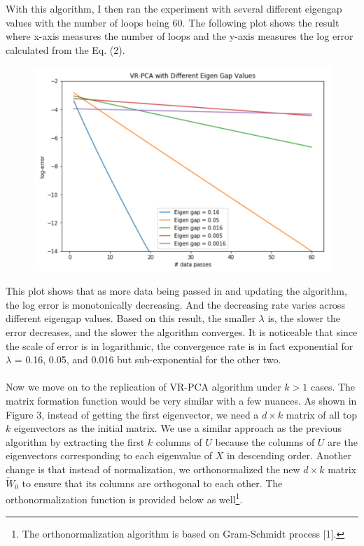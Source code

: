 \documentclass{article}
\begin{document}
With this algorithm, I then ran the experiment with several different eigengap values with the number of loops being 60. The following plot shows the result where x-axis measures the number of loops and the y-axis measures the log error calculated from the Eq. (2).
\begin{figure}[H]
    \centering
    \includegraphics[scale=0.5]{./plot1.png}
\end{figure}
This plot shows that as more data being passed in and updating the algorithm, the log error is monotonically decreasing. And the decreasing rate varies across different eigengap values. Based on this result, the smaller $\lambda$ is, the slower the error decreases, and the slower the algorithm converges. It is noticeable that since the scale of error is in logarithmic, the convergence rate is in fact exponential for $\lambda$ = 0.16, 0.05, and 0.016 but sub-exponential for the other two. \\ \\
Now we move on to the replication of VR-PCA algorithm under $k>1$ cases. The matrix formation function would be very similar with a few nuances. As shown in Figure 3, instead of getting the first eigenvector, we need a $d\times k$ matrix of all top $k$ eigenvectors as the initial matrix. We use a similar approach as the previous algorithm by extracting the first $k$ columns of $U$ because the columns of $U$ are the eigenvectors corresponding to each eigenvalue of $X$ in descending order. Another change is that instead of normalization, we orthonormalized the new $d\times k$ matrix $\tilde{W}_0$ to ensure that its columns are orthogonal to each other. The orthonormalization function is provided below as well\footnote{The orthonormalization algorithm is based on Gram-Schmidt process [1].}. 
\end{document}

